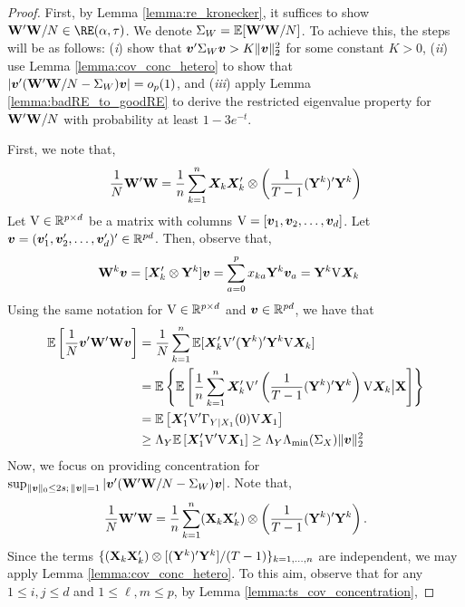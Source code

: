 \begin{proof}
    First, by Lemma \ref{lemma:re_kronecker}, it suffices to show $\Wb'\Wb/N\in\RE(\alpha,\tau)$. We denote $\Sigma_W = \mathbb{E}[\mathbf{W}'\mathbf{W}/N]$. To achieve this, the steps will be as follows: (\textit{i}) show that $\bm{v}' \Sigma_W \bm{v} > K \| \bm{v}\|_2^2$ for some constant $K>0$, (\textit{ii}) use Lemma \ref{lemma:cov_conc_hetero} to show that $|\bm{v}'(\mathbf{W}'\mathbf{W}/N - \Sigma_W )\bm{v} | = o_p(1)$, and (\textit{iii}) apply Lemma \ref{lemma:badRE_to_goodRE} to derive the restricted eigenvalue property for $\mathbf{W}'\mathbf{W}/N$ with probability at least $1 - 3e^{-t}$.
    
    First, we note that,
    \begin{align*}
        \frac{1}{N} \mathbf{W}'\mathbf{W} = \frac{1}{n} \sum_{k=1}^n \bm{X}_k\bm{X}_k' \otimes \left( \frac{1}{T-1} (\mathbf{Y}^k)'\mathbf{Y}^k  \right)
    \end{align*}
    Let $\mathrm{V} \in\mathbb{R}^{p\times d}$ be a matrix with columns $\mathrm{V} = [\bm{v}_1,\bm{v}_2,\ldots ,\bm{v}_d]$. Let $\bm{v} = (\bm{v}_1',\bm{v}_2',\ldots ,\bm{v}_d')'\in\mathbb{R}^{pd}$. Then, observe that,
    \begin{align*}
        \mathbf{W}^k \bm{v} &=  [\bm{X}_k' \otimes \mathbf{Y}^k] \bm{v} = \sum_{a=0}^{p} x_{ka} \mathbf{Y}^k \bm{v}_a = \mathbf{Y}^k \mathrm{V} \bm{X}_k
    \end{align*}
    Using the same notation for $\mathrm{V}\in\mathbb{R}^{p\times d}$ and $\bm{v}\in\mathbb{R}^{pd}$, we have that 
    \begin{align*}
        \mathbb{E}\left[ \frac{1}{N} \bm{v}'\mathbf{W}' \mathbf{W} \bm{v} \right] &= \frac{1}{N} \sum_{k=1}^n \mathbb{E}[  \bm{X}_k'\mathrm{V}' (\mathbf{Y}^k)' \mathbf{Y}^k \mathrm{V} \bm{X}_k] \\
        &= \mathbb{E}\left\{\mathbb{E}\left[  \frac{1}{n}  \sum_{k=1}^n  \bm{X}_k'\mathrm{V}' \left(\frac{1}{T-1} (\mathbf{Y}^k)' \mathbf{Y}^k \right) \mathrm{V} \bm{X}_k\big| \mathbf{X} \right]\right\}\\
        &= \mathbb{E}\left[  \bm{X}_1'\mathrm{V}' \Gamma_{Y|X_1}(0) \mathrm{V} \bm{X}_1 \right] \\
        &\geq \Lambda_{Y} \mathbb{E}\left[  \bm{X}_1'\mathrm{V}' \mathrm{V} \bm{X}_1 \right] \geq \Lambda_{Y} \Lambda_{\min}(\Sigma_{X}) \|\bm{v}\|_2^2
    \end{align*}
    Now, we focus on providing concentration for $\sup_{\|\bm{v}\|_0 \leq 2s;\, \|\bm{v}\|=1} |\bm{v}'(\mathbf{W}'\mathbf{W}/N - \Sigma_W )\bm{v} |$. Note that,
    $$ \frac{1}{N} \mathbf{W}'\mathbf{W} = \frac{1}{n}\sum_{k=1}^n  (\mathbf{X}_k\mathbf{X}_k') \otimes \left(\frac{1}{T-1} (\mathbf{Y}^k)'\mathbf{Y}^k \right).$$
    Since the terms $\{(\mathbf{X}_k\mathbf{X}_k') \otimes [(\mathbf{Y}^k)'\mathbf{Y}^k] /(T-1) \}_{k=1,\ldots,n}$ are independent, we may apply Lemma \ref{lemma:cov_conc_hetero}. To this aim, observe that for any $1\leq i,j\leq d$ and $1\leq \ell,m \leq p$, by Lemma \ref{lemma:ts_cov_concentration},

\end{proof}
